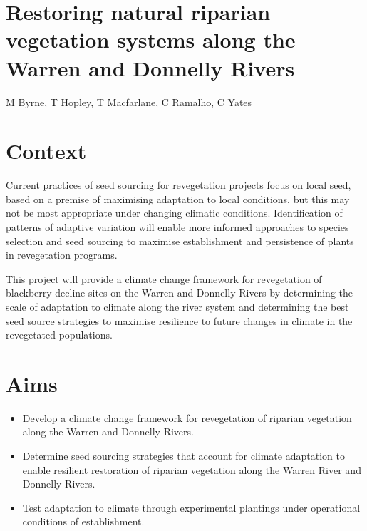 \documentclass[version=last,
    paper=a4, %
    10pt, %
    usenames,
    dvipsnames,
    oneside, %
    headings=openany, %
    DIV=15 %
]{scrbook}
\begin{document}
\section*{Restoring natural riparian vegetation systems along the Warren and
Donnelly Rivers
}

M Byrne, T Hopley, T Macfarlane, C Ramalho, C Yates


\section*{Context}
Current practices of seed sourcing for revegetation projects focus on
local seed, based on a premise of maximising adaptation to local
conditions, but this may not be most appropriate under changing climatic
conditions. Identification of patterns of adaptive variation will enable
more informed approaches to species selection and seed sourcing to
maximise establishment and persistence of plants in revegetation
programs.

This project will provide a climate change framework for revegetation of
blackberry-decline sites on the Warren and Donnelly Rivers by
determining the scale of adaptation to climate along the river system
and determining the best seed source strategies to maximise resilience
to future changes in climate in the revegetated populations.



\section*{Aims}
\begin{itemize}
\itemsep1pt\parskip0pt
\item
  Develop a climate change framework for revegetation of riparian
  vegetation along the Warren and Donnelly Rivers.
\item
  Determine seed sourcing strategies that account for climate adaptation
  to enable resilient restoration of riparian vegetation along the
  Warren River and Donnelly Rivers.
\item
  Test adaptation to climate through experimental plantings under
  operational conditions of establishment.
\end{itemize}
\end{document}
